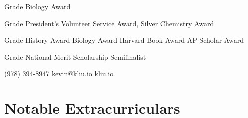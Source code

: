 \documentclass[paper=letter]{tccv}
\begin{document}
\begin{yearlist}

\item{ Grade}
     {Biology Award}
     {}

\item{ Grade}
     {President's Volunteer Service Award, Silver\newline
     Chemistry Award}
     {}

\item{ Grade}
    {History Award\newline
     Biology Award\newline
     Harvard Book Award\newline
     AP Scholar Award}
     {}

\item{ Grade}
    {National Merit Scholarship Semifinalist}
     {}

\end{yearlist}

    {(978) 394-8947}
    {kevin@kliu.io}
    {kliu.io}

\section{Notable Extracurriculars}
\end{document}
